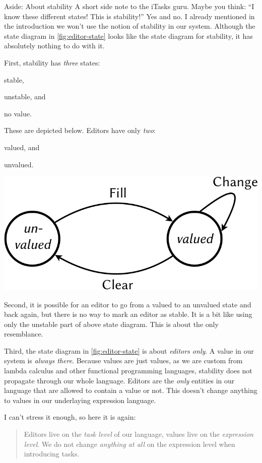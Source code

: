 \begin{margintext}{Aside: About stability}
A short side note to the iTasks guru.
Maybe you think: \enquote{I know these different states! This is stability!}
Yes and no.
I already mentioned in the introduction we won't use the notion of stability in our system.
Although the state diagram in \autoref{fig:editor-state} looks like the state diagram for stability,
it has absolutely nothing to do with it.

First, stability has \emph{three} states:
\begin{enumerate*}
  \item stable,
  \item unstable, and
  \item no value.
\end{enumerate*}
These are depicted below.
Editors have only \emph{two}:
\begin{enumerate*}
  \item valued, and
  \item unvalued.
\end{enumerate*}

\includegraphics[width=\marginwidth,page=2]{figures/editor-state-crop.pdf}

Second,
it is possible for an editor to go from a valued to an unvalued state and back again,
but there is no way to mark an editor as stable.
It is a bit like using only the unstable part of above state diagram.
This is about the only resemblance.

Third,
the state diagram in \autoref{fig:editor-state} is about \emph{editors only}.
A value in our system is \emph{always there}.
Because values are just values,
as we are custom from lambda calculus and other functional programming languages,
stability does not propagate through our whole language.
Editors are the \emph{only} entities in our language that are allowed to contain a value or not.
This doesn't change anything to values in our underlaying expression language.

I can't stress it enough, so here it is again:
\begin{quote}
Editors live on the \emph{task level} of our language,
values live on the \emph{expression level}.
We do not change \emph{anything at all} on the expression level when introducing tasks.
\end{quote}
\end{margintext}


